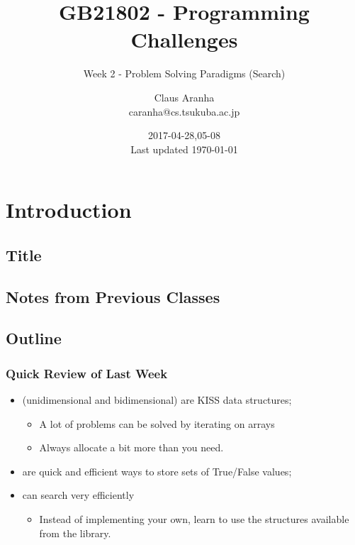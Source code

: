 \documentclass{beamer}
\title[GB21802]{GB21802 - Programming Challenges}
\subtitle[]{Week 2 - Problem Solving Paradigms (Search)}
\author[Claus Aranha]{Claus Aranha\\{\footnotesize caranha@cs.tsukuba.ac.jp}}
\institute{College of Information Science}
\date{2017-04-28,05-08\\{\tiny Last updated \today}}
\begin{document}
\section{Introduction}
\subsection{Title}
\begin{frame}
\maketitle
\end{frame}

\subsection{Notes from Previous Classes}



\subsection{Outline}

\begin{frame}
  \frametitle{Quick Review of Last Week}
  \begin{itemize}
  \item {} (unidimensional and bidimensional) are 
    KISS data structures;
    \begin{itemize}
    \item A lot of problems can be solved by iterating on arrays
    \item Always allocate a bit more than you need.
    \end{itemize}

    \medskip

  \item {} are quick and efficient ways to store sets of
    True/False values;

    \medskip
    
  \item {} can search very efficiently
    \begin{itemize}
    \item Instead of implementing your own, learn to use the
      structures available from the library.
    \end{itemize}
  \end{itemize}
\end{frame}
\end{document}
